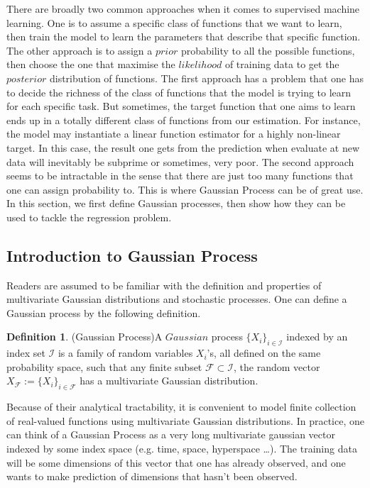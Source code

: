 \documentclass[11pt,a4paper]{article}
\theoremstyle{definition}
\newtheorem{definition}[theorem]{Definition}
\numberwithin{equation}{section}
\begin{document}
	There are broadly two common approaches when it comes to supervised machine learning. One is to assume a specific class of functions that we want to learn, then train the model to learn the parameters that describe that specific function. The other approach is to assign a $prior$ probability to all the possible functions, then choose the one that maximise the $likelihood$ of training data to get the $posterior$ distribution of functions. The first approach has a problem that one has to decide the richness of the class of functions that the model is trying to learn for each specific task. But sometimes, the target function that one aims to learn ends up in a totally different class of functions from our estimation. For instance, the model may instantiate a linear function estimator for a highly non-linear target. In this case, the result one gets from the prediction when evaluate at new data will inevitably be subprime or sometimes, very poor. The second approach seems to be intractable in the sense that there are just too many functions that one can assign probability to. This is where Gaussian Process can be of great use. In this section, we first define Gaussian processes, then show how they can be used to tackle the regression problem. 
	
	\subsection{Introduction to Gaussian Process}
	
 Readers are assumed to be familiar with the definition and properties of multivariate Gaussian distributions and stochastic processes. One can define a Gaussian process by the following definition.
	
	\begin{definition}(Gaussian Process)\label{def:gp}
		A $Gaussian$ process $\{X_i\}_{i\in \mathcal{I}}$ indexed by an index set $\mathcal{I}$ is a family of random variables $X_i$'s, all defined on the same probability space, such that any finite subset $\mathcal{F}\subset\mathcal{I}$, the random vector $X_{\mathcal{F}} := \{X_i\}_{i\in \mathcal{F}}$ has a multivariate Gaussian distribution.\cite{Lalley}
	\end{definition}
	
	Because of their analytical tractability, it is convenient to model finite collection of real-valued functions using  multivariate Gaussian distributions. In practice, one can think of a Gaussian Process as a very long multivariate gaussian vector indexed by some index space (e.g. time, space, hyperspace \ldots). The training data will be some dimensions of this vector that one has already observed, and one wants to make prediction of dimensions that hasn't been observed.
	
\end{document}
